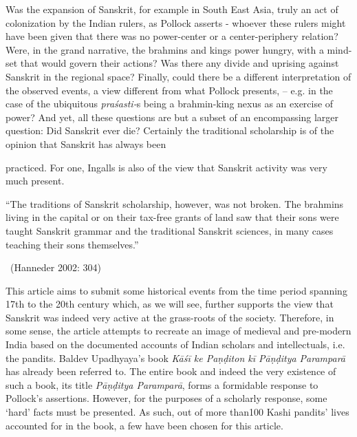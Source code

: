 Was the expansion of Sanskrit, for example in South East Asia, truly an act of colonization by the Indian rulers, as Pollock asserts - whoever these rulers might have been given that there was no power-center or a center-periphery relation? Were, in the grand narrative, the brahmins and kings power hungry, with a mind-set that would govern their actions? Was there any divide and uprising against Sanskrit in the regional space? Finally, could there be a different interpretation of the observed events, a view different from what Pollock presents, – e.g. in the case of the ubiquitous \textit{praśasti-}s being a brahmin-king nexus as an exercise of power? And yet, all these questions are but a subset of an encompassing larger question: Did Sanskrit ever die? Certainly the traditional scholarship is of the opinion that Sanskrit has always \hbox{been}\break

\eject



 practiced. For one, Ingalls is also of the view that Sanskrit activity was very much present.

\begin{myquote}
“The traditions of Sanskrit scholarship, however, was not broken. The brahmins living in the capital or on their tax-free grants of land saw that their sons were taught Sanskrit grammar and the traditional Sanskrit sciences, in many cases teaching their sons themselves.” 

~\hfill (Hanneder 2002: 304)
\end{myquote}

This article aims to submit some historical events from the time period spanning 17th to the 20th century which, as we will see, further supports the view that Sanskrit was indeed very active at the grass-roots of the society. Therefore, in some sense, the article attempts to recreate an image of medieval and pre-modern India based on the documented accounts of Indian scholars and intellectuals, i.e. the pandits. Baldev Upadhyaya’s book \textit{Kāśī ke Paṇḍiton kī Pāṇḍitya Paramparā} has already been referred to. The entire book and indeed the very existence of such a book, its title \textit{Pāṇḍitya Paramparā}, forms a formidable response to Pollock’s assertions. However, for the purposes of a scholarly response, some ‘hard’ facts must be presented. As such, out of more than100 Kashi pandits’ lives accounted for in the book, a few have been chosen for this article.

